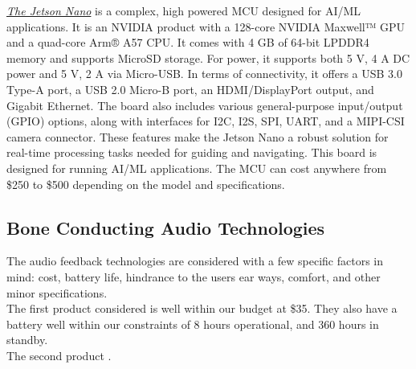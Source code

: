 \noindent \underline{\textit{The Jetson Nano}} is a complex, high powered MCU designed for AI/ML applications. It is an NVIDIA product with a 128-core NVIDIA Maxwell™ GPU and a quad-core Arm® A57 CPU. It comes with 4 GB of 64-bit LPDDR4 memory and supports MicroSD storage. For power, it supports both 5 V, 4 A DC power and 5 V, 2 A via Micro-USB. In terms of connectivity, it offers a USB 3.0 Type-A port, a USB 2.0 Micro-B port, an HDMI/DisplayPort output, and Gigabit Ethernet. The board also includes various general-purpose input/output (GPIO) options, along with interfaces for I2C, I2S, SPI, UART, and a MIPI-CSI camera connector. These features make the Jetson Nano a robust solution for real-time processing tasks needed for guiding and navigating. This board is designed for running AI/ML applications. The MCU can cost anywhere from \$250 to \$500 depending on the model and specifications. \\

\subsection{Bone Conducting Audio Technologies}
\label{sec:audio_tech}
\noindent The audio feedback technologies are considered with a few specific factors in mind: cost, battery life, hindrance to the users ear ways, comfort, and other minor specifications. \\

\noindent The first product \cite{BoneConductEar1} considered is well within our budget at \$35. They also have a battery well within our constraints of 8 hours operational, and 360 hours in standby. \\

\noindent The second product . 